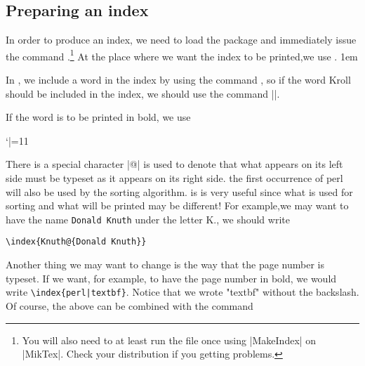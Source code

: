 \setlength{\columnsep}{2em}
\begin{multicols}{2}

\section{Preparing an index}

In order to produce an index, we need to load the
package   and immediately issue the command \cmd{\makeindex}.\footnote{You will also need to at least run the file once using |MakeIndex| on |MikTex|. Check your distribution if you getting problems.}
At the place where
we want the index to be printed,we use \cmd{\printindex}.
\parindent1em

In \latex, we include a word
in the index by using the command \cmd{\index}, so if the word Kroll should be included in
the index, we should use the command ||.

If the word is to be printed in bold, we use

\bgroup
 \catcode`|=11
\gdef\idxmain#1{%
   \def\idxmainentryi##1##2##3;{%
      \index{Kr0=\textbf{#1}|textbf}
    }
   \idxmainentryi#1;    
}  


\egroup

\idxmain{Kroll}





There is a  special character |@| is used to denote that what appears on its left side must be
typeset as it appears on its right side.  the first occurrence of perl will also be used
by the sorting algorithm. is is very useful since what is used for sorting and what
will be printed may be different! For example,we may want to have the name 
\texttt{Donald Knuth}  under the letter K., we should write


\verb+\index{Knuth@{Donald Knuth}}+

Another thing we may want to change is the way that the page number is typeset.
If we want, for example, to have the page number in bold, we would write
\verb+\index{perl|textbf}+.  Notice that we wrote "textbf"  without the backslash. Of course,
the above can be combined with the  command



\end{multicols}
